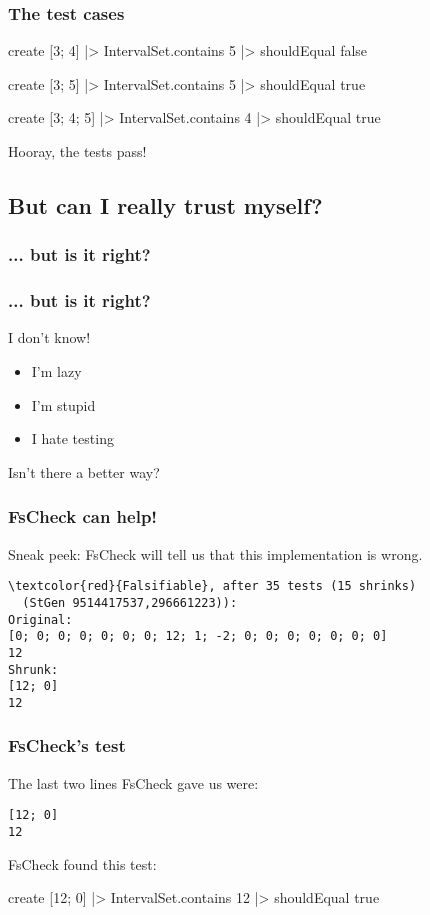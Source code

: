 \documentclass{beamer}
\begin{document}
\begin{frame}[fragile]
\frametitle{The test cases}
\begin{fslisting}
    create [3; 4]
    |> IntervalSet.contains 5
    |> shouldEqual false

    create [3; 5]
    |> IntervalSet.contains 5
    |> shouldEqual true

    create [3; 4; 5]
    |> IntervalSet.contains 4
    |> shouldEqual true
\end{fslisting}
Hooray, the tests pass!
\end{frame}

\subsection{But can I really trust myself?}

\begin{frame}
\frametitle{... but is it right?}
\end{frame}

\begin{frame}
\frametitle{... but is it right?}

I don't know!

\begin{itemize}
\item I'm lazy
\item I'm stupid
\item I hate testing
\end{itemize}

Isn't there a better way?
\end{frame}

\begin{frame}[fragile]
\frametitle{FsCheck can help!}

Sneak peek: FsCheck will tell us that this implementation is wrong.

\begin{Verbatim}[commandchars=\\\{\}]
\textcolor{red}{Falsifiable}, after 35 tests (15 shrinks)
  (StGen 9514417537,296661223)):
Original:
[0; 0; 0; 0; 0; 0; 0; 12; 1; -2; 0; 0; 0; 0; 0; 0; 0]
12
Shrunk:
[12; 0]
12
\end{Verbatim}

\end{frame}

\begin{frame}[fragile]
\frametitle{FsCheck's test}
The last two lines FsCheck gave us were:
\begin{verbatim}
[12; 0]
12
\end{verbatim}

FsCheck found this test:

\begin{fslisting}
create [12; 0]
|> IntervalSet.contains 12
|> shouldEqual true
\end{fslisting}
\end{frame}
\end{document}
